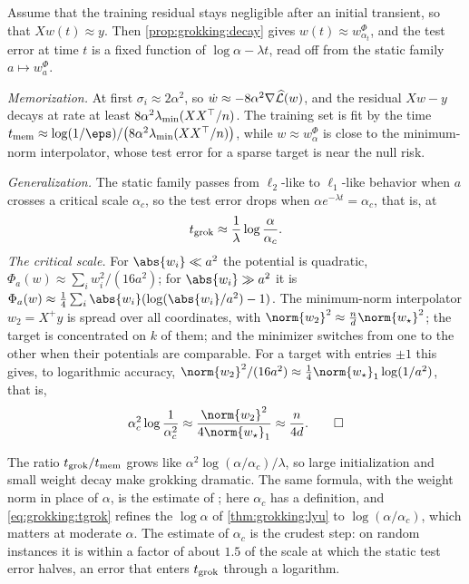 \begin{refsection}
\begin{heuristic}
Assume that the training residual stays negligible after an initial transient, so that $Xw(t)\approx y$. Then \cref{prop:grokking:decay} gives $w(t)\approx w^\Phi_{\alpha_t}$, and the test error at time $t$ is a fixed function of $\log\alpha-\lambda t$, read off from the static family $a\mapsto w^\Phi_a$.

\emph{Memorization.} At first $\sigma_i\approx2\alpha^2$, so $\dot w\approx-8\alpha^2\nabla\widehat{\mathcal{L}}(w)$, and the residual $Xw-y$ decays at rate at least $8\alpha^2\lambda_{\min}(XX^\top/n)$. The training set is fit by the time $\grokmem\approx\log(1/\eps)/\bigl(8\alpha^2\lmin(XX^\top/n)\bigr)$, while $w\approx w^\Phi_\alpha$ is close to the minimum-norm interpolator, whose test error for a sparse target is near the null risk.

\emph{Generalization.} The static family passes from $\ell_2$-like to $\ell_1$-like behavior when $a$ crosses a critical scale $\alpha_c$, so the test error drops when $\alpha e^{-\lambda t}=\alpha_c$, that is, at
\begin{equation}\label{eq:grokking:tgrok}
  t_{\mathrm{grok}}\approx\frac1\lambda\log\frac\alpha{\alpha_c} .
\end{equation}
\emph{The critical scale.} For $\abs{w_i}\ll a^2$ the potential is quadratic, $\Phi_a(w)\approx\sum_iw_i^2/(16a^2)$; for $\abs{w_i}\gg a^2$ it is $\Phi_a(w)\approx\frac14\sum_i\abs{w_i}(\log(\abs{w_i}/a^2)-1)$. The minimum-norm interpolator $w_2=X^+y$ is spread over all coordinates, with $\norm{w_2}^2\approx\frac nd\norm{w_\star}^2$; the target is concentrated on $k$ of them; and the minimizer switches from one to the other when their potentials are comparable. For a target with entries $\pm1$ this gives, to logarithmic accuracy, $\norm{w_2}^2/(16a^2)\approx\frac14\norm{w_\star}_1\log(1/a^2)$, that is,
\[
  \alpha_c^2\log\frac1{\alpha_c^2}\approx\frac{\norm{w_2}^2}{4\norm{w_\star}_1}\approx\frac{n}{4d}.\qedhere
\]
\end{heuristic}

The ratio $t_{\mathrm{grok}}/t_{\mathrm{mem}}$ grows like $\alpha^2\log(\alpha/\alpha_c)/\lambda$, so large initialization and small weight decay make grokking dramatic. The same formula, with the weight norm in place of $\alpha$, is the estimate of \textcite{LiuEtAl2023}; here $\alpha_c$ has a definition, and \eqref{eq:grokking:tgrok} refines the $\log\alpha$ of \cref{thm:grokking:lyu} to $\log(\alpha/\alpha_c)$, which matters at moderate $\alpha$. The estimate of $\alpha_c$ is the crudest step: on random instances it is within a factor of about $1.5$ of the scale at which the static test error halves, an error that enters $t_{\mathrm{grok}}$ through a logarithm.


\end{refsection}
